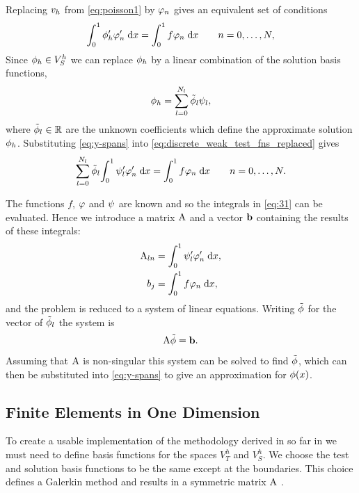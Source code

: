 {Replacing ${v}_h$ from \cref{eq:poisson1} by $\varphi_{n}$ gives an equivalent set of conditions
\begin{equation}
  {\int_0^1   \phi'_h \varphi_{n}'   {\; \mathrm{{d}}}{x}}  = {\int_0^1  f\varphi_{n}  {\; \mathrm{{d}}}{x}} \qquad n=0,\ldots,N,
  \label{eq:discrete_weak_test_fns_replaced}
\end{equation}
Since ${\phi}_h\in V_{S}^{h}$ we can replace ${\phi}_h$ by a linear combination of the solution basis functions, \ie
\begin{equation}
  {\phi}_h = \sum_{l=0}^{N_l} \tilde{\phi}_l\psi_l,
  \label{eq:y-spans}
\end{equation}
where $\tilde{\phi}_l \in \mathbb{R}$ are the unknown coefficients which define the approximate solution ${\phi}_h$.
Substituting \cref{eq:y-spans} into \cref{eq:discrete_weak_test_fns_replaced} gives
\begin{equation}
  \sum_{l=0}^{N_l} \tilde{\phi}_l{\int_0^1  \psi_l'\varphi'_{n}  {\; \mathrm{{d}}}{x}} ={\int_0^1  f\varphi_{n}  {\; \mathrm{{d}}}{x}}
  \qquad n=0,\ldots,N.
  \label{eq:31}
\end{equation}

The functions $f$, $\varphi$ and $\psi$ are known and so the integrals in \cref{eq:31} can be evaluated.
Hence we introduce a matrix $\mathrm{A}$ and a vector ${\boldsymbol{\mathrm{b}}}$ containing the results of these integrals:
\begin{equation}
  \begin{aligned}
    \mathrm{A}_{ln} &= {\int_0^1  \psi_l'\varphi'_{n}  {\; \mathrm{{d}}}{x}}, \\
    b_{j} &= {\int_0^1  f\varphi_{n}  {\; \mathrm{{d}}}{x}}, \\
    \label{eq:Aij_bj}
  \end{aligned}
\end{equation}
and the problem is reduced to a system of linear equations.
Writing $\tilde{\phi}$ for the vector of $\tilde{\phi}_l$ the system is
\begin{equation}
  \mathrm{A} \tilde{\phi} = {\boldsymbol{\mathrm{b}}}.
  \label{eq:final_galerkin}
\end{equation}
Assuming that $\mathrm{A}$ is non-singular this system can be solved to find $\tilde{\phi}$, which can then be substituted into \cref{eq:y-spans} to give an approximation for $\phi(x)$.


\subsection{Finite Elements in One Dimension}
\label{sub:Actual-Finite-Elements}

To create a usable implementation of the methodology derived in so far in  we must need to define basis functions for the spaces $V_{T}^{h}$ and $V_S^h$.
We choose the test and solution basis functions to be the same except at the boundaries.
This choice defines a Galerkin method and results in a symmetric matrix $\mathrm{A}$ \cite[215]{Zeinkiewicz1967}.

}
